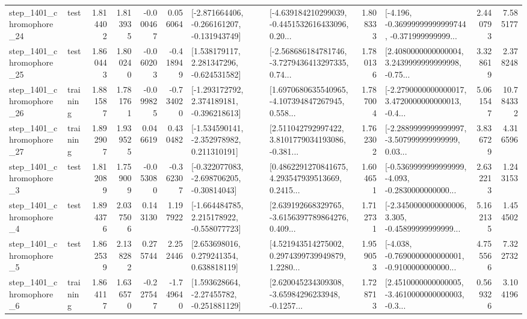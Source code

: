 \begin{tabular}{llrrrrllrlrr}
 step\_1401\_chromophore\_24 &      test &      1.814402 &    1.813935 &     -0.000467 &  0.056064 &  [-2.871664406, -0.266161207, -0.131943749] &  [-4.639184210299039, -0.4451532616433096, 0.20... &       1.808333 &  [-4.196, -0.36999999999999744, -0.371999999999... &            2.440793 &          7.585177 \\
 step\_1401\_chromophore\_25 &      test &      1.860443 &    1.800240 &     -0.060203 & -0.418949 &    [1.538179117, 2.281347296, -0.624531582] &  [-2.568686184781746, -3.7279436413297335, 0.74... &       1.780136 &  [2.4080000000000004, 3.2439999999999998, -0.75... &            3.328619 &          2.378248 \\
 step\_1401\_chromophore\_26 &  training &      1.881587 &    1.781761 &     -0.099825 & -0.734020 &   [-1.293172792, 2.374189181, -0.396218613] &  [1.6970680635540965, -4.107394847267945, 0.558... &       1.787004 &  [-2.2790000000000017, 3.4720000000000013, -0.4... &            5.061547 &         10.784332 \\
 step\_1401\_chromophore\_27 &  training &      1.892907 &    1.939525 &      0.046619 &  0.430482 &   [-1.534590141, -2.352978982, 0.211310191] &  [2.511042792997422, 3.8101779034193086, -0.381... &       1.762302 &  [-2.2889999999999997, -3.507999999999999, 0.03... &            3.836729 &          4.316596 \\
  step\_1401\_chromophore\_3 &      test &      1.812089 &    1.759009 &     -0.053080 & -0.362307 &   [-0.322077083, -2.698706205, -0.30814043] &  [0.4862291270841675, 4.293547939513669, 0.2415... &       1.604651 &  [-0.5369999999999999, -4.093, -0.2830000000000... &            2.632213 &          1.243153 \\
  step\_1401\_chromophore\_4 &      test &      1.894376 &    2.037506 &      0.143130 &  1.197922 &   [-1.664484785, 2.215178922, -0.558077723] &  [2.639192668329765, -3.6156397789864276, 0.409... &       1.712731 &  [-2.3450000000000006, 3.305, -0.45899999999999... &            5.162135 &          1.454502 \\
  step\_1401\_chromophore\_5 &      test &      1.862539 &    2.138282 &      0.275744 &  2.252446 &     [2.653698016, 0.279241354, 0.638818119] &  [4.521943514275002, 0.2974399739949879, 1.2280... &       1.959053 &  [-4.038, -0.7690000000000001, -0.9100000000000... &            4.755566 &          7.322732 \\
  step\_1401\_chromophore\_6 &  training &      1.864117 &    1.636570 &     -0.227547 & -1.749640 &    [1.593628664, -2.27455782, -0.251881129] &  [2.620045234309308, -3.65984296233948, -0.1257... &       1.728713 &  [2.4510000000000005, -3.4610000000000003, -0.3... &            0.569326 &          3.104196 \\

\end{tabular}
